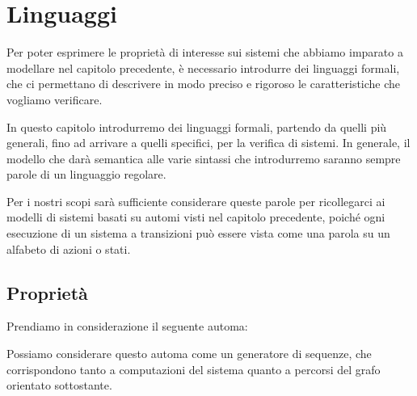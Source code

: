 \chapter{Linguaggi}

Per poter esprimere le proprietà di interesse sui sistemi che abbiamo imparato a modellare nel capitolo precedente,
è necessario introdurre dei linguaggi formali, che ci permettano di descrivere in modo preciso e rigoroso le caratteristiche che vogliamo verificare.

In questo capitolo introdurremo dei linguaggi formali, partendo da quelli più generali, fino ad arrivare a quelli specifici, per la verifica di sistemi.
In generale, il modello che darà semantica alle varie sintassi che introdurremo saranno sempre parole di un linguaggio regolare.

Per i nostri scopi sarà sufficiente considerare queste parole per ricollegarci ai modelli di sistemi basati su automi visti nel capitolo precedente, poiché ogni esecuzione di un sistema a transizioni può essere vista come una parola su un alfabeto di azioni o stati.

\section{Proprietà}

Prendiamo in considerazione il seguente automa:

\begin{figure}[h]
  \centering
\end{figure}

Possiamo considerare questo automa come un generatore di sequenze, che corrispondono tanto a computazioni del sistema quanto a percorsi del grafo orientato sottostante.

